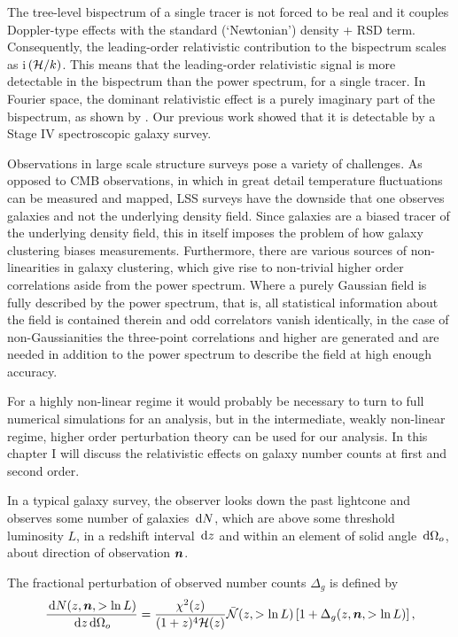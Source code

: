 {The tree-level bispectrum of a single tracer is not forced to be real and it couples Doppler-type effects with the standard (`Newtonian') density + RSD term. Consequently, the leading-order relativistic contribution to the bispectrum scales as i\,$(\mathcal{H}/k)$. 
This means that the leading-order relativistic signal is more detectable in the bispectrum than the power spectrum, for a single tracer.
In Fourier space, the dominant relativistic effect is a purely imaginary part of the bispectrum, as shown by \cite{Clarkson:2018dwn,Maartens:2019yhx}. Our previous work \cite{Maartens:2019yhx} showed that it is detectable by a Stage IV spectroscopic galaxy survey.


Observations in large scale structure surveys pose a variety of challenges. As opposed to CMB observations, in which in great detail temperature fluctuations can be measured and mapped, LSS surveys have the downside that one observes galaxies and not the underlying density field. Since galaxies are a biased tracer of the underlying density field, this in itself imposes the problem of how galaxy clustering biases measurements. Furthermore, there are various sources of non-linearities in galaxy clustering, which give rise to non-trivial higher order correlations aside from the power spectrum. Where a purely Gaussian field is fully described by the power spectrum, that is, all statistical information about the field is contained therein and odd correlators vanish identically, in the case of non-Gaussianities the three-point correlations and higher are generated and are needed in addition to the power spectrum to describe the field at high enough accuracy. 

For a highly non-linear regime it would probably be necessary to turn to full numerical simulations for an analysis, but in the intermediate, weakly non-linear regime, higher order perturbation theory can be used for our analysis. In this chapter I will discuss the relativistic effects on galaxy number counts at first and second order.  

In a typical galaxy survey, the observer looks down the past lightcone and observes some number of galaxies $\,\mathrm{d} N$, which are above some threshold luminosity $L$, in a redshift interval $\,\mathrm{d} z$ and within an element of solid angle $\,\mathrm{d} \Omega_o$, about direction of observation $\bm {n}$. 

The fractional perturbation of observed number counts $\Delta_g$ is defined by 
\begin{equation}
	\frac{\,\mathrm{d} N(z, \bm {n}, > \ln L)}{\,\mathrm{d} z \,\mathrm{d} \Omega_o} = \frac{\chi^2(z)}{(1 + z)^4 \mathcal{H}(z)} \bar{\mathcal{N}}(z, > \ln L) \left[ 1 + \Delta_g(z, \bm {n}, >\ln L)\right], 
\end{equation}

}
